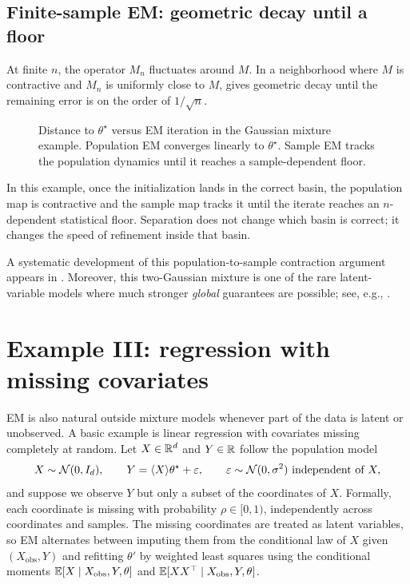 \documentclass[11pt]{article}
\begin{document}
\subsection{Finite-sample EM: geometric decay until a floor}
\label{sec:finite-sample-floor}

At finite $n$, the operator $M_n$ fluctuates around $M$.
In a neighborhood where $M$ is contractive and $M_n$ is uniformly close to $M$,  gives geometric decay until the remaining error is on the order of $1/\sqrt{n}$.

\begin{figure}[t]
  \centering
  
  \caption{Distance to $\theta^\star$ versus EM iteration in the Gaussian mixture example. Population EM converges linearly to $\theta^\star$. Sample EM tracks the population dynamics until it reaches a sample-dependent floor.}
  \label{fig:em-pop-vs-sample}
\end{figure}

In this example, once the initialization lands in the correct basin, the population map is contractive and the sample map tracks it until the iterate reaches an $n$-dependent statistical floor.
Separation does not change which basin is correct; it changes the speed of refinement inside that basin.

A systematic development of this population-to-sample contraction argument appears in \citet[Thm.~1]{balakrishnan_wainwright_yu_2014_em}.
Moreover, this two-Gaussian mixture is one of the rare latent-variable models where much stronger \emph{global} guarantees are possible; see, e.g., \citet[Thm.~1]{xu_hsu_maleki_2016_global_em}.

\clearpage
\section[Missing covariates]{Example III: regression with missing covariates}
\label{sec:missing-covariates}

EM is also natural outside mixture models whenever part of the data is latent or unobserved.
A basic example is linear regression with covariates missing completely at random.
Let $X\in\mathbb{R}^d$ and $Y\in\mathbb{R}$ follow the population model
\[
X \sim \mathcal{N}(0,I_d),
\qquad
Y = \langle X\rangle{\theta^\star} + \varepsilon,
\qquad
\varepsilon \sim \mathcal{N}(0,\sigma^2)\ \text{independent of }X,
\]
and suppose we observe $Y$ but only a subset of the coordinates of $X$.
Formally, each coordinate is missing with probability $\rho\in[0,1)$, independently across coordinates and samples.
The missing coordinates are treated as latent variables, so EM alternates between imputing them from the conditional law of $X$ given $(X_{\mathrm{obs}},Y)$ and refitting $\theta'$ by weighted least squares using the conditional moments $\mathbb{E}[X\mid X_{\mathrm{obs}},Y,\theta]$ and $\mathbb{E}[XX^\top\mid X_{\mathrm{obs}},Y,\theta]$.
\end{document}
